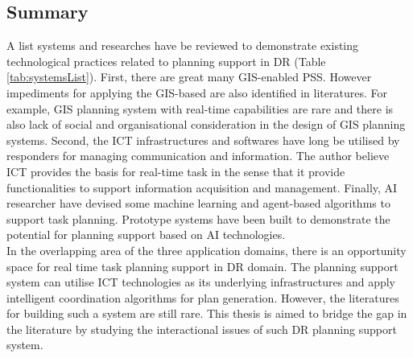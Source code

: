 \subsection{Summary}
A list systems and researches have be reviewed to demonstrate existing technological practices related to planning support in \ac{DR} (Table \ref{tab:systemsList}).  First, there are great many \ac{GIS}-enabled \acf{PSS}. However impediments for applying the \ac{GIS}-based are also identified in literatures. For example, \ac{GIS} planning system with real-time capabilities are rare and there is also lack of social and organisational consideration in the design of \ac{GIS} planning systems. Second, the \ac{ICT} infrastructures and softwares have long be utilised by responders for managing communication and information. The author believe \ac{ICT} provides the basis for real-time task in the sense that it provide functionalities to support information acquisition and management. Finally, \ac{AI} researcher have devised some machine learning and agent-based algorithms to support task planning. Prototype systems have been built to demonstrate the potential for planning support based on \ac{AI} technologies.\\ 

In the overlapping area of the three application domains, there is an opportunity space for real time task planning support in \ac{DR} domain. The planning support system can utilise \ac{ICT} technologies as its underlying infrastructures and apply intelligent coordination algorithms for plan generation. However, the literatures for building such a system are still rare. This thesis is aimed to bridge the gap in the literature by studying the interactional issues of such \ac{DR} planning support system.\\


